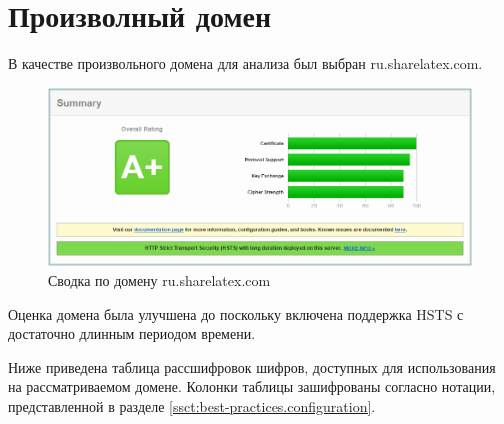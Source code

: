 \section{Произволный домен}

В качестве произвольного домена для анализа был выбран ru.sharelatex.com. 

\begin{figure}[H]
    \centering
    \includegraphics[width=\textwidth]{resources/03_summary.png}
    \caption{Сводка по домену ru.sharelatex.com}
    \label{fig:03-summary}
\end{figure}

Оценка домена была улучшена до  поскольку включена поддержка HSTS с достаточно длинным периодом времени.

Ниже приведена таблица рассшифровок шифров, доступных для использования на рассматриваемом домене. Колонки таблицы зашифрованы 
согласно нотации, представленной в разделе \ref{ssct:best-practices.configuration}.

